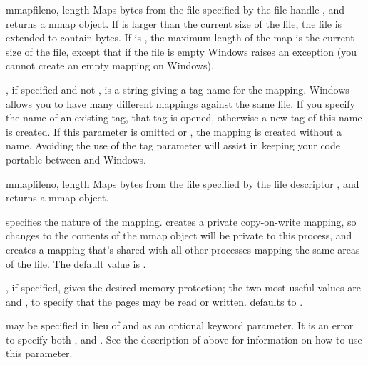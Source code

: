 \begin{funcdesc}{mmap}{fileno, length}
   Maps  bytes from the file
  specified by the file handle , and returns a mmap
  object.  If  is larger than the current size of the file,
  the file is extended to contain  bytes.  If 
  is , the maximum length of the map is the current size
  of the file, except that if the file is empty Windows raises an
  exception (you cannot create an empty mapping on Windows).

  , if specified and not , is a string giving
  a tag name for the mapping.  Windows allows you to have many
  different mappings against the same file.  If you specify the name
  of an existing tag, that tag is opened, otherwise a new tag of this
  name is created.  If this parameter is omitted or , the
  mapping is created without a name.  Avoiding the use of the tag
  parameter will assist in keeping your code portable between \UNIX{}
  and Windows.
\end{funcdesc}

\begin{funcdescni}{mmap}{fileno, length}
   Maps  bytes from the file
  specified by the file descriptor , and returns a mmap
  object.

   specifies the nature of the mapping.
   creates a private copy-on-write mapping, so
  changes to the contents of the mmap object will be private to this
  process, and  creates a mapping that's shared
  with all other processes mapping the same areas of the file.  The
  default value is .

  , if specified, gives the desired memory protection; the
  two most useful values are  and
  , to specify that the pages may be read or
  written.   defaults to .

   may be specified in lieu of  and 
  as an optional keyword parameter.  It is an error to specify both
  ,  and .  See the description of
   above for information on how to use this parameter.
\end{funcdescni}


